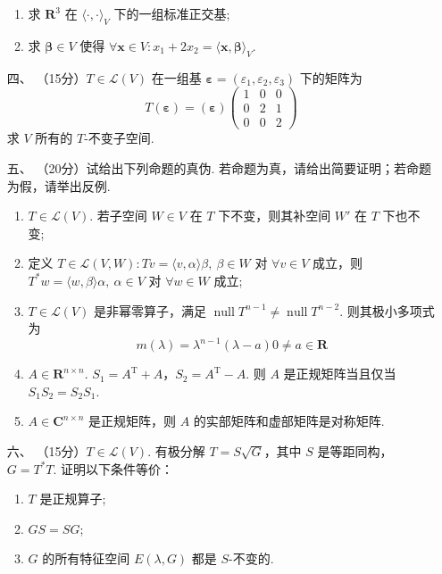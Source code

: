 \begin{enumerate}
\begin{enumerate}[label=(\arabic*)]
        \item 求 $ \mathbf{R}^3 $ 在 $ \langle \cdot, \cdot \rangle_V $ 下的一组标准正交基;
        \item 求 $ \boldsymbol{\beta} \in V $ 使得 $ \forall \boldsymbol{x} \in V: x_1 + 2x_2 = \langle \boldsymbol{x}, \boldsymbol{\beta} \rangle_V $.
    \end{enumerate}
	\item[四、]（15分）$ T \in \mathcal{L}(V) $ 在一组基 $ \boldsymbol{\varepsilon} = (\varepsilon_1, \varepsilon_2, \varepsilon_3) $ 下的矩阵为
    \[ T(\boldsymbol{\varepsilon}) = (\boldsymbol{\varepsilon}) \begin{pmatrix} 1 & 0 & 0 \\ 0 & 2 & 1 \\ 0 & 0 & 2 \end{pmatrix} \]
    求 $ V $ 所有的 $ T $-不变子空间.
	\item[五、]（20分）试给出下列命题的真伪. 若命题为真，请给出简要证明；若命题为假，请举出反例.
	\begin{enumerate}[label=(\arabic*)]
        \item $ T \in \mathcal{L}(V) $. 若子空间 $ W \in V $ 在 $ T $ 下不变，则其补空间 $ W' $ 在 $ T $ 下也不变;
        \item 定义 $ T \in \mathcal{L}(V, W) : Tv = \langle v, \alpha \rangle \beta,\ \beta \in W $ 对 $ \forall v \in V $ 成立，则 $ T^* w = \langle w, \beta \rangle \alpha,\ \alpha \in V $ 对 $ \forall w \in W $ 成立;
        \item $ T \in \mathcal{L}(V) $ 是非幂零算子，满足 $ \operatorname{null} T^{n - 1} \neq \operatorname{null} T^{n - 2} $. 则其极小多项式为
        \[ m(\lambda) = \lambda^{n-1}(\lambda - a) 0 \neq a \in \mathbf{R} \]
        \item $ A \in \mathbf{R}^{n \times n} $. $ S_1 = A^{\mathrm{T}} + A $，$ S_2 = A^{\mathrm{T}} - A $. 则 $ A $ 是正规矩阵当且仅当 $ S_1 S_2 = S_2 S_1 $.
        \item $ A \in \mathbf{C}^{n \times n} $ 是正规矩阵，则 $ A $ 的实部矩阵和虚部矩阵是对称矩阵.
    \end{enumerate}
	\item[六、]（15分）$ T \in \mathcal{L}(V) $. 有极分解 $ T = S \sqrt{G} $，其中 $ S $ 是等距同构，$ G = T^* T $. 证明以下条件等价：
    \begin{enumerate}[label=(\arabic*)]
        \item $ T $ 是正规算子;
        \item $ GS = SG $;
        \item $ G $ 的所有特征空间 $ E(\lambda, G) $ 都是 $ S $-不变的.
    \end{enumerate}
\end{enumerate}

\clearpage
